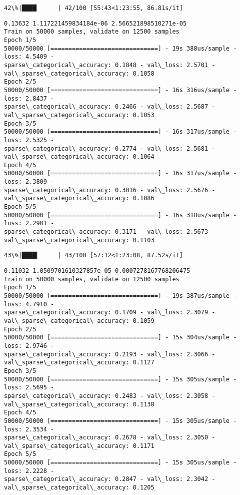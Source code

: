 \documentclass[11pt]{article}
\begin{document}
    \begin{Verbatim}[commandchars=\\\{\}]
 42\%|████▏     | 42/100 [55:43<1:23:55, 86.81s/it]
    \end{Verbatim}

    \begin{Verbatim}[commandchars=\\\{\}]
0.13632 1.117221459834184e-06 2.566521898510271e-05
Train on 50000 samples, validate on 12500 samples
Epoch 1/5
50000/50000 [==============================] - 19s 388us/sample - loss: 4.5409 -
sparse\_categorical\_accuracy: 0.1848 - val\_loss: 2.5701 -
val\_sparse\_categorical\_accuracy: 0.1058
Epoch 2/5
50000/50000 [==============================] - 16s 316us/sample - loss: 2.8437 -
sparse\_categorical\_accuracy: 0.2466 - val\_loss: 2.5687 -
val\_sparse\_categorical\_accuracy: 0.1053
Epoch 3/5
50000/50000 [==============================] - 16s 317us/sample - loss: 2.5325 -
sparse\_categorical\_accuracy: 0.2774 - val\_loss: 2.5681 -
val\_sparse\_categorical\_accuracy: 0.1064
Epoch 4/5
50000/50000 [==============================] - 16s 317us/sample - loss: 2.3809 -
sparse\_categorical\_accuracy: 0.3016 - val\_loss: 2.5676 -
val\_sparse\_categorical\_accuracy: 0.1086
Epoch 5/5
50000/50000 [==============================] - 16s 318us/sample - loss: 2.2901 -
sparse\_categorical\_accuracy: 0.3171 - val\_loss: 2.5673 -
val\_sparse\_categorical\_accuracy: 0.1103
    \end{Verbatim}

    \begin{Verbatim}[commandchars=\\\{\}]
 43\%|████▎     | 43/100 [57:12<1:23:08, 87.52s/it]
    \end{Verbatim}

    \begin{Verbatim}[commandchars=\\\{\}]
0.11032 1.0509701610327857e-05 0.0007278167768206475
Train on 50000 samples, validate on 12500 samples
Epoch 1/5
50000/50000 [==============================] - 19s 387us/sample - loss: 4.7910 -
sparse\_categorical\_accuracy: 0.1709 - val\_loss: 2.3079 -
val\_sparse\_categorical\_accuracy: 0.1059
Epoch 2/5
50000/50000 [==============================] - 15s 304us/sample - loss: 2.9746 -
sparse\_categorical\_accuracy: 0.2193 - val\_loss: 2.3066 -
val\_sparse\_categorical\_accuracy: 0.1127
Epoch 3/5
50000/50000 [==============================] - 15s 305us/sample - loss: 2.5695 -
sparse\_categorical\_accuracy: 0.2483 - val\_loss: 2.3058 -
val\_sparse\_categorical\_accuracy: 0.1138
Epoch 4/5
50000/50000 [==============================] - 15s 305us/sample - loss: 2.3534 -
sparse\_categorical\_accuracy: 0.2678 - val\_loss: 2.3050 -
val\_sparse\_categorical\_accuracy: 0.1171
Epoch 5/5
50000/50000 [==============================] - 15s 305us/sample - loss: 2.2228 -
sparse\_categorical\_accuracy: 0.2847 - val\_loss: 2.3042 -
val\_sparse\_categorical\_accuracy: 0.1205
    \end{Verbatim}
\end{document}
